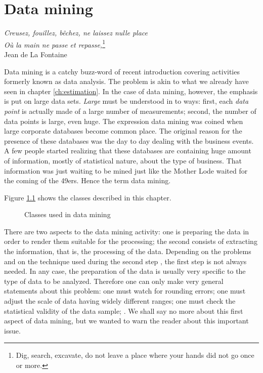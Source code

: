 \documentclass[twoside]{book}
\begin{document}
\fi

\chapter{Data mining} \vspace{1 ex}
\begin{flushright} {\sl Creusez, fouillez, b\^echez, ne laissez nulle place}\\
{\sl O\`{u} la main ne passe et repasse,}\footnote{Dig, search,
excavate, do not leave a place where your hands did not go once or
more.}\\ Jean de La Fontaine
\end{flushright}
\vspace{1 ex} \label{ch:datamining} Data mining is a catchy
buzz-word of recent introduction covering activities formerly
known as data analysis. The problem is akin to what we already
have seen in chapter \ref{ch:estimation}. In the case of data
mining, however, the emphasis is put on large data sets. {\sl
Large} must be understood in to ways: first, each {\sl data point}
is actually made of a large number of measurements; second, the
number of data points is large, even huge. The expression data
mining was coined when large corporate databases become common
place. The original reason for the presence of these databases was
the day to day dealing with the business events. A few people
started realizing that these databases are containing huge amount
of information, mostly of statistical nature, about the type of
business. That information was just waiting to be mined just like
the Mother Lode waited for the coming of the 49ers. Hence the term
data mining.

Figure \ref{fig:dataminingclasses} shows the classes described in
this chapter.
\begin{figure}
\center{}
\caption{Classes used in data mining}\label{fig:dataminingclasses}
\end{figure}
There are two aspects to the data mining activity: one is
preparing the data in order to render them suitable for the
processing; the second consists of extracting the information,
that is, the processing of the data. Depending on the problems and
on the technique used during the second step , the first step is
not always needed. In any case, the preparation of the data is
usually very specific to the type of data to be analyzed.
Therefore one can only make very general statements about this
problem: one must watch for rounding errors; one must adjust the
scale of data having widely different ranges; one must check the
statistical validity of the data sample; \etc. We shall say no
more about this first aspect of data mining, but we wanted to warn
the reader about this important issue.
\end{document}

